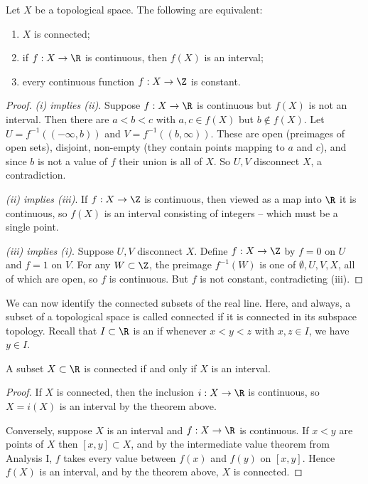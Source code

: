 \begin{theorem}\label{thm:connchar}
    Let $X$ be a topological space. The following are equivalent:
    \begin{enumerate}[label=(\roman*)]
        \item $X$ is connected;
        \item if $f: X \rightarrow \R$ is continuous, then $f(X)$ is an interval;
        \item every continuous function $f: X \rightarrow \Z$ is constant.
    \end{enumerate}
\end{theorem}
\begin{proof}
    \emph{(i) implies (ii)}. Suppose $f: X \rightarrow \R$ is continuous but $f(X)$ is not an interval. Then there are $a < b < c$ with $a, c \in f(X)$ but $b \not \in f(X)$. Let $U = f^{-1}((-\infty, b))$ and $V = f^{-1}((b, \infty))$. These are open (preimages of open sets), disjoint, non-empty (they contain points mapping to $a$ and $c$), and since $b$ is not a value of $f$ their union is all of $X$. So $U, V$ disconnect $X$, a contradiction.

    \emph{(ii) implies (iii)}. If $f: X \rightarrow \Z$ is continuous, then viewed as a map into $\R$ it is continuous, so $f(X)$ is an interval consisting of integers -- which must be a single point.

    \emph{(iii) implies (i)}. Suppose $U, V$ disconnect $X$. Define $f: X \rightarrow \Z$ by $f = 0$ on $U$ and $f = 1$ on $V$. For any $W \subset \Z$, the preimage $f^{-1}(W)$ is one of $\emptyset, U, V, X$, all of which are open, so $f$ is continuous. But $f$ is not constant, contradicting (iii).
\end{proof}

We can now identify the connected subsets of the real line. Here, and always, a subset of a topological space is called connected if it is connected in its subspace topology. Recall that $I \subset \R$ is an  if whenever $x < y < z$ with $x, z \in I$, we have $y \in I$.

\begin{theorem}
    A subset $X \subset \R$ is connected if and only if $X$ is an interval.
\end{theorem}
\begin{proof}
    If $X$ is connected, then the inclusion $i: X \rightarrow \R$ is continuous, so $X = i(X)$ is an interval by the theorem above.

    Conversely, suppose $X$ is an interval and $f: X \rightarrow \R$ is continuous. If $x < y$ are points of $X$ then $[x, y] \subset X$, and by the intermediate value theorem from Analysis I, $f$ takes every value between $f(x)$ and $f(y)$ on $[x, y]$. Hence $f(X)$ is an interval, and by the theorem above, $X$ is connected.
\end{proof}

